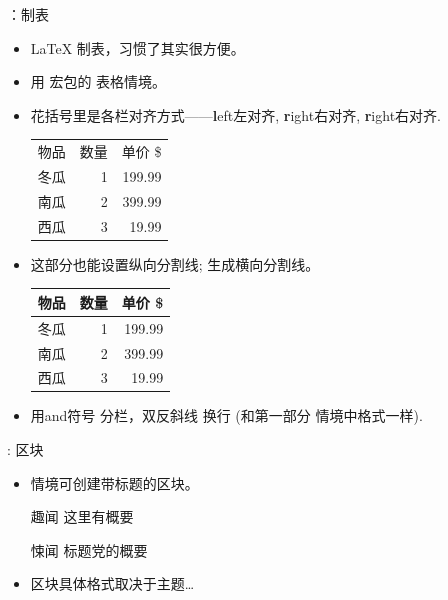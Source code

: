 \documentclass{beamer}
\begin{document}
\begin{frame}[fragile]{\insertsection：制表}
\begin{itemize}
\item \LaTeX{} 制表，习惯了其实很方便。
\item 用  宏包的 表格情境。 
\item 花括号里是各栏对齐方式——\textbf{l}eft左对齐, \textbf{r}ight右对齐, \textbf{r}ight右对齐.
\begin{exampletwouptiny}
\begin{tabular}{lrr}
物品   & 数量 & 单价 \$ \\
冬瓜   & 1   & 199.99  \\
南瓜   & 2   & 399.99  \\
西瓜   & 3   & 19.99   \\
\end{tabular}
\end{exampletwouptiny}
\item 这部分也能设置纵向分割线;  生成横向分割线。
\begin{exampletwouptiny}
\begin{tabular}{|l|r|r|} \hline
物品   & 数量 & 单价 \$ \\\hline
冬瓜   & 1   & 199.99  \\
南瓜   & 2   & 399.99  \\
西瓜   & 3   & 19.99   \\\hline
\end{tabular}
\end{exampletwouptiny}
\item 用and符号 \keystrokebftt{\&} 分栏，双反斜线 \keystrokebftt{\bs}\keystrokebftt{\bs} 换行 (和第一部分  情境中格式一样).
\end{itemize}
\end{frame}

\begin{frame}[fragile]{\insertsection: 区块}
\begin{itemize}
\item {} 情境可创建带标题的区块。
\begin{exampletwouptiny}
\begin{block}{趣闻}
这里有概要
\end{block}

\begin{alertblock}{悚闻}
标题党的概要
\end{alertblock}
\end{exampletwouptiny}

\item 区块具体格式取决于主题\ldots
\end{itemize}
\end{frame}
\end{document}
